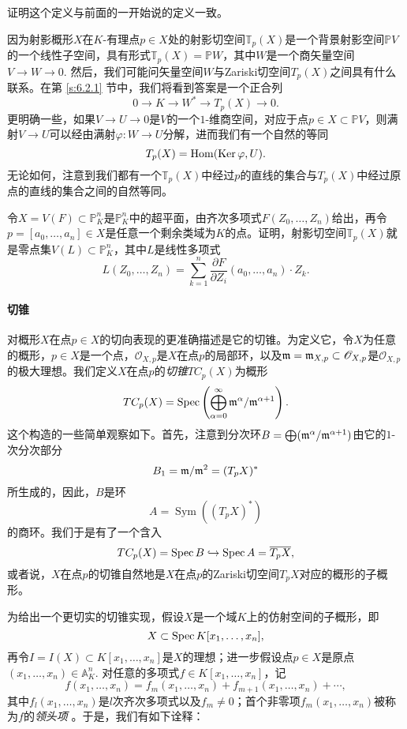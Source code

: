 \begin{exe}\label{exe:3.27}
	证明这个定义与前面的一开始说的\naive 定义一致。
\end{exe}

因为射影概形$X$在$K$-有理点$p\in X$处的射影切空间$\mathbb T_p(X)$是一个背景射影空间$\mathbb PV$的一个线性子空间，具有形式$\mathbb T_p(X)=\mathbb PW$，其中$W$是一个商矢量空间$V\to W\to 0$. 然后，我们可能问矢量空间$W$与Zariski切空间$T_p(X)$之间具有什么联系。在第 \ref{s:6.2.1} 节中，我们将看到答案是一个正合列
\[
	0\longrightarrow K\longrightarrow W^* \longrightarrow T_p(X)\longrightarrow 0.
\]
更明确一些，如果$V\to U\to 0$是$V$的一个$1$-维商空间，对应于点$p\in X\subset \mathbb PV$，则满射$V\to U$可以经由满射$\varphi:W\to U$分解，进而我们有一个自然的等同
\[
	T_p(X)=\operatorname{Hom}(\operatorname{Ker}\varphi,U).
\]
无论如何，注意到我们都有一个$\mathbb T_p(X)$中经过$p$的直线的集合与$T_p(X)$中经过原点的直线的集合之间的自然等同。

\begin{exe}\label{exe:3.28}
	令$X=V(F)\subset \mathbb P_K^n$是$\mathbb P_K^n$中的超平面，由齐次多项式$F(Z_0,\dots,Z_n)$给出，再令$p=[a_0,\dots,a_n]\in X$是任意一个剩余类域为$K$的点。证明，射影切空间$\mathbb T_p(X)$就是零点集$V(L)\subset \mathbb P_K^n$，其中$L$是线性多项式
	\[
		L(Z_0,\dots,Z_n)=\sum_{k=1}^n\frac{\partial F}{\partial Z_i}(a_0,\dots,a_n)\cdot Z_k.
	\]
\end{exe}

\paragraph*{切锥}
对概形$X$在点$p\in X$的切向表现的更准确描述是它的切锥。为定义它，令$X$为任意的概形，$p\in X$是一个点，$\mathscr O_{X,p}$是$X$在点$p$的局部环，以及$\mathfrak{m}=\mathfrak{m}_{X,p}\subset \mathscr O_{X,p}$是$\mathscr O_{X,p}$的极大理想。我们定义$X$在点$p$的\textit{切锥}$TC_p(X)$为概形
\[
	TC_p(X)=\operatorname{Spec} \left(\bigoplus_{\alpha=0}^\infty \mathfrak{m}^\alpha/\mathfrak{m}^{\alpha+1}\right).
\]
这个构造的一些简单观察如下。首先，注意到分次环$B=\bigoplus (\mathfrak{m}^\alpha/\mathfrak{m}^{\alpha+1})$由它的$1$-次分次部分
\[
	B_1=\mathfrak{m}/\mathfrak{m}^2=(T_pX)^*
\]
所生成的，因此，$B$是环
\[
	A=\operatorname{Sym}((T_pX)^*)
\]
的商环。我们于是有了一个含入
\[
	TC_p(X)=\operatorname{Spec} B\hookrightarrow \operatorname{Spec} A=\overline{T_pX},
\]
或者说，$X$在点$p$的切锥自然地是$X$在点$p$的Zariski切空间$T_pX$对应的概形的子概形。

为给出一个更切实的切锥实现，假设$X$是一个域$K$上的仿射空间的子概形，即
\[
	X\subset \operatorname{Spec} K[x_1,\dots,x_n],
\]
再令$I=I(X)\subset K[x_1,\dots,x_n]$是$X$的理想；进一步假设点$p\in X$是原点$(x_1,\dots,x_n)\in \mathbb A_K^n$. 对任意的多项式$f\in K[x_1,\dots,x_n]$，记
\[
	f(x_1,\dots,x_n)=f_m(x_1,\dots,x_n)+f_{m+1}(x_1,\dots,x_n)+\cdots,
\]
其中$f_l(x_1,\dots,x_n)$是$l$次齐次多项式以及$f_m\neq 0$；首个非零项$f_m(x_1,\dots,x_n)$被称为$f$的\textit{领头项}%
。于是，我们有如下诠释：

